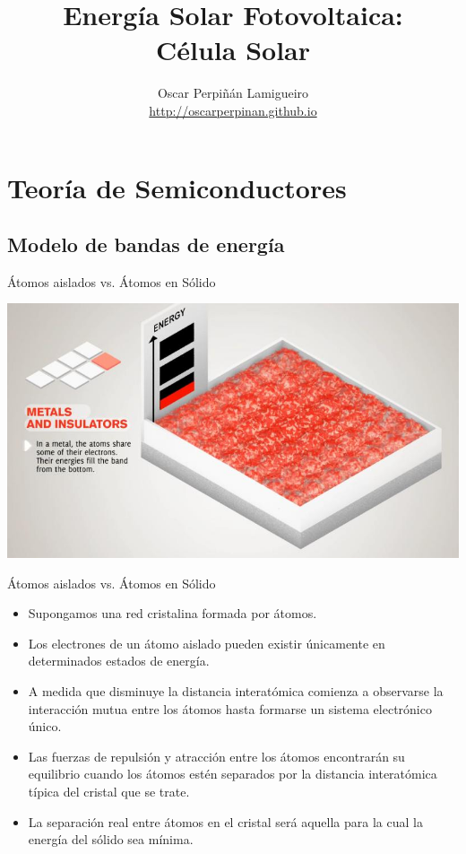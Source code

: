 \documentclass[xcolor={usenames,svgnames,dvipsnames}]{beamer}
\author{Oscar Perpiñán Lamigueiro \\ \url{http://oscarperpinan.github.io}}
\date{}
\title{Energía Solar Fotovoltaica:\\Célula Solar}
\begin{document}
\maketitle

\section{Teoría de Semiconductores}
\label{sec-1}

\subsection{Modelo de bandas de energía}
\label{sec-1-1}

\begin{frame}[label=sec-1-1-1]{Átomos aislados vs. Átomos en Sólido}

\href{http://upload.wikimedia.org/wikipedia/commons/8/81/Metals_and_insulators,_quantum_difference_from_band_structure.ogv}{\includegraphics[width=.9\linewidth]{../figs/Metals_and_insulators_video.jpg}}
\end{frame}

\begin{frame}[label=sec-1-1-2]{Átomos aislados vs. Átomos en Sólido}
\begin{itemize}
\item Supongamos una red cristalina formada por átomos.

\item Los \alert{electrones de un átomo aislado} pueden existir \alert{únicamente en determinados estados de energía}.

\item A medida que disminuye la distancia interatómica comienza a observarse la \alert{interacción mutua entre los átomos} hasta formarse un sistema electrónico único.

\item Las \alert{fuerzas de repulsión y atracción} entre los átomos encontrarán su \alert{equilibrio} cuando los átomos estén separados por la \alert{distancia interatómica típica del cristal} que se trate.

\item La separación real entre átomos en el cristal será aquella para la cual la \alert{energía del sólido sea mínima}.
\end{itemize}
\end{frame}
\end{document}
